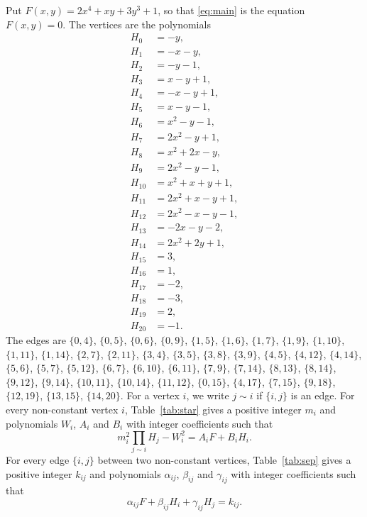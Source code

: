 \documentclass[11pt]{article}
\begin{document}
Put $F(x,y)=2x^{4}+xy+3y^{3}+1$, so that \eqref{eq:main} is the equation $F(x,y)=0$. The vertices are the polynomials
\begin{align*}
H_{0}&=-y,\\
H_{1}&=-x-y,\\
H_{2}&=-y-1,\\
H_{3}&=x-y+1,\\
H_{4}&=-x-y+1,\\
H_{5}&=x-y-1,\\
H_{6}&=x^{2}-y-1,\\
H_{7}&=2x^{2}-y+1,\\
H_{8}&=x^{2}+2x-y,\\
H_{9}&=2x^{2}-y-1,\\
H_{10}&=x^{2}+x+y+1,\\
H_{11}&=2x^{2}+x-y+1,\\
H_{12}&=2x^{2}-x-y-1,\\
H_{13}&=-2x-y-2,\\
H_{14}&=2x^{2}+2y+1,\\
H_{15}&=3,\\
H_{16}&=1,\\
H_{17}&=-2,\\
H_{18}&=-3,\\
H_{19}&=2,\\
H_{20}&=-1.
\end{align*}
The edges are $\{0,4\}$, $\{0,5\}$, $\{0,6\}$, $\{0,9\}$, $\{1,5\}$, $\{1,6\}$, $\{1,7\}$, $\{1,9\}$, $\{1,10\}$, $\{1,11\}$, $\{1,14\}$, $\{2,7\}$, $\{2,11\}$, $\{3,4\}$, $\{3,5\}$, $\{3,8\}$, $\{3,9\}$, $\{4,5\}$, $\{4,12\}$, $\{4,14\}$, $\{5,6\}$, $\{5,7\}$, $\{5,12\}$, $\{6,7\}$, $\{6,10\}$, $\{6,11\}$, $\{7,9\}$, $\{7,14\}$, $\{8,13\}$, $\{8,14\}$, $\{9,12\}$, $\{9,14\}$, $\{10,11\}$, $\{10,14\}$, $\{11,12\}$, $\{0,15\}$, $\{4,17\}$, $\{7,15\}$, $\{9,18\}$, $\{12,19\}$, $\{13,15\}$, $\{14,20\}$. For a vertex $i$, we write $j\sim i$ if $\{i,j\}$ is an edge.
For every non-constant vertex $i$, Table~\ref{tab:star} gives a positive integer $m_{i}$ and polynomials $W_{i}$, $A_{i}$ and $B_{i}$ with integer coefficients such that
\begin{equation}\label{eq:star}
m_i^2\prod_{j\sim i}H_j-W_i^2=A_iF+B_iH_i.
\end{equation}
For every edge $\{i,j\}$ between two non-constant vertices, Table~\ref{tab:sep} gives a positive integer $k_{ij}$ and polynomials $\alpha_{ij}$, $\beta_{ij}$ and $\gamma_{ij}$ with integer coefficients such that
\begin{equation}\label{eq:sep}
\alpha_{ij}F+\beta_{ij}H_i+\gamma_{ij}H_j=k_{ij}.
\end{equation}
\end{document}
